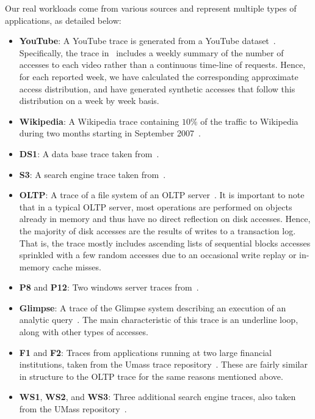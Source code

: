 \documentclass[10pt,a4paper]{article}
\begin{document}
Our real workloads come from various sources and represent multiple types of applications, as detailed below:
\begin{itemize}
\item
\textbf{YouTube}: A YouTube trace is generated from a YouTube dataset~\cite{YouTubeDataSet}.
Specifically, the trace in~\cite{YouTubeDataSet} includes a weekly summary of the number of accesses to each video rather than a continuous time-line of requests.
Hence, for each reported week, we have calculated the corresponding approximate access distribution, and have generated synthetic accesses that follow this distribution on a week by week basis.

\item
\textbf{Wikipedia}: A Wikipedia trace containing $10\%$ of the traffic to Wikipedia during two months starting in September 2007~\cite{WikiTrace}.

\item
\textbf{DS1}: A data base trace taken from~\cite{ARC}.

\item
\textbf{S3}: A search engine trace taken from~\cite{ARC}.

\item
\textbf{OLTP}: A trace of a file system of an OLTP server~\cite{ARC}.
It is important to note that in a typical OLTP server, most operations are performed on objects already in memory and thus have no direct reflection on disk accesses.
Hence, the majority of disk accesses are the results of writes to a transaction log.
That is, the trace mostly includes ascending lists of sequential blocks accesses sprinkled with a few random accesses due to an occasional write replay or in-memory cache misses.

\item
\textbf{P8} and \textbf{P12}: Two windows server traces from~\cite{ARC}.

\item
\textbf{Glimpse}: A trace of the Glimpse system describing an execution of an analytic query~\cite{LIRS}.
The main characteristic of this trace is an underline loop, along with other types of accesses.

\item
\textbf{F1} and \textbf{F2}: Traces from applications running at two large financial institutions, taken from the Umass trace repository~\cite{UMAS}.
These are fairly similar in structure to the OLTP trace for the same reasons mentioned above.

\item
\textbf{WS1}, \textbf{WS2}, and \textbf{WS3}: Three additional search engine traces, also taken from the UMass repository~\cite{UMAS}.
\end{itemize}
\end{document}
